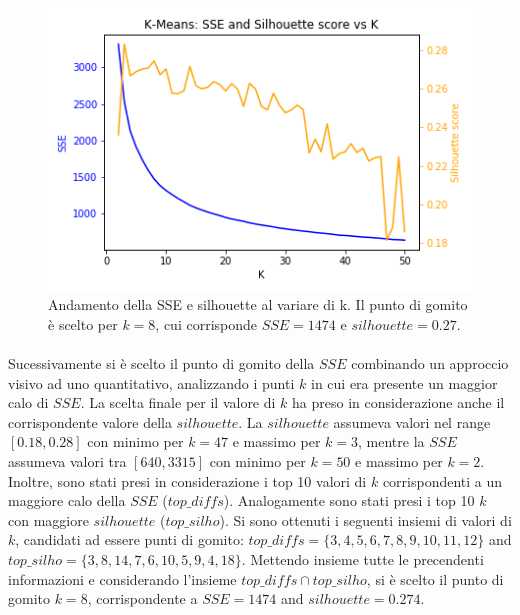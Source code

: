 \documentclass[10pt,a4paper,twocolumn]{article}
\begin{document}
\begin{figure}[hbtp]
\centering
\includegraphics[width=1\columnwidth]{../images/sse_silhouette_vs_k.png}
\caption{Andamento della SSE e silhouette al variare di k. Il punto di gomito è scelto per $k=8$, cui corrisponde $SSE=1474$ e $silhouette=0.27$.}
\label{fig:sse_sil_vs_k}
\end{figure}%

\paragraph{}
Sucessivamente si è scelto il punto di gomito della $SSE$ combinando un approccio visivo ad uno quantitativo, analizzando i punti $k$ in cui era presente un maggior calo di $SSE$. La scelta finale per il valore di $k$ ha preso in considerazione anche il corrispondente valore della $silhouette$. La $silhouette$ assumeva valori nel range $\left[0.18, 0.28\right]$ con minimo per $k=47$ e massimo per $k=3$, mentre la $SSE$ assumeva valori tra $\left[640, 3315\right]$ con minimo per $k=50$ e massimo per $k=2$. Inoltre, sono stati presi in considerazione i top 10 valori di $k$ corrispondenti a un maggiore calo della $SSE$ ($top\_diffs$). Analogamente sono stati presi i top 10 $k$ con maggiore $silhouette$ ($top\_silho$). Si sono ottenuti i seguenti insiemi di valori di $k$, candidati ad essere punti di gomito: $top\_diffs=\lbrace3,4,5,6,7,8,9,10,11,12\rbrace$ and $top\_silho=\lbrace3,8,14,7,6,10,5,9,4,18\rbrace$. Mettendo insieme tutte le precendenti informazioni e considerando l'insieme $top\_diffs \cap top\_silho$, si è scelto il punto di gomito $k=8$, corrispondente a $SSE=1474$ and $silhouette=0.274$.
\end{document}
